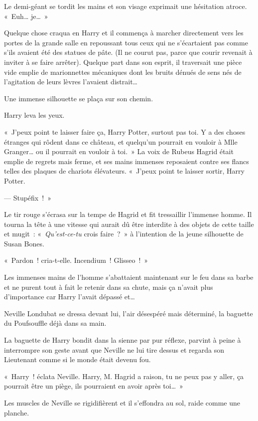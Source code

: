 Le demi-géant se tordit les mains et son visage exprimait une hésitation atroce. «~Euh… je…~»

Quelque chose craqua en Harry et il commença à marcher directement vers les portes de la grande salle en repoussant tous ceux qui ne s'écartaient pas comme s'ils avaient été des statues de pâte. (Il ne courut pas, parce que courir revenait à inviter à se faire arrêter). Quelque part dans son esprit, il traversait une pièce vide emplie de marionnettes mécaniques dont les bruits dénués de sens nés de l'agitation de leurs lèvres l'avaient distrait…

Une immense silhouette se plaça sur son chemin.

Harry leva les yeux.

«~J'peux point te laisser faire ça, Harry Potter, surtout pas toi. Y a des choses étranges qui rôdent dans ce château, et quelqu'un pourrait en vouloir à Mlle Granger… ou il pourrait en vouloir à toi.~» La voix de Rubeus Hagrid était emplie de regrets mais ferme, et ses mains immenses reposaient contre ses flancs telles des plaques de chariots élévateurs. «~J'peux point te laisser sortir, Harry Potter.

--- Stupéfix~!~»

Le tir rouge s'écrasa sur la tempe de Hagrid et fit tressaillir l'immense homme. Il tourna la tête à une vitesse qui aurait dû être interdite à des objets de cette taille et mugit~: «~\emph{Qu'est-ce-tu} crois faire~?~» à l'intention de la jeune silhouette de Susan Bones.

«~Pardon~! cria-t-elle. Incendium~! Glisseo~!~»

Les immenses mains de l'homme s'abattaient maintenant sur le feu dans sa barbe et ne purent tout à fait le retenir dans sa chute, mais ça n'avait plus d'importance car Harry l'avait dépassé et…

Neville Londubat se dressa devant lui, l'air désespéré mais déterminé, la baguette du Poufsouffle déjà dans sa main.

La baguette de Harry bondit dans la sienne par pur réflexe, parvint à peine à interrompre son geste avant que Neville ne lui tire dessus et regarda son Lieutenant comme si le monde était devenu fou.

«~Harry~! éclata Neville. Harry, M. Hagrid a raison, tu ne peux pas y aller, ça pourrait être un piège, ils pourraient en avoir après toi…~»

Les muscles de Neville se rigidifièrent et il s'effondra au sol, raide comme une planche.

